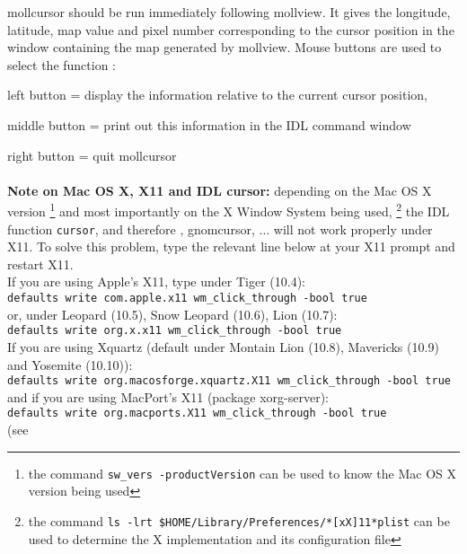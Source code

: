 \begin{codedescription}
{mollcursor should be run immediately following mollview. It gives the
longitude, latitude, map value and pixel number
corresponding to the cursor position in the window containing the map generated
by mollview. Mouse buttons are used to select the function :  

left button = display the information relative to the current cursor position, 

middle button = print out this information in the IDL command window 

right button = quit mollcursor\\
\\
{\bf{Note on Mac OS X, X11 and IDL cursor:}} 
depending on the Mac OS X version%
\footnote{the command {\tt sw\_vers -productVersion}
 can be used to know the Mac OS X version being used}
and most importantly on the X Window System being used,%
\footnote{the command
{\tt ls -lrt  \$HOME/Library/Preferences/*[xX]11*plist}
can be used to determine the X implementation and its configuration file}
the IDL function {\tt cursor}, and therefore \healpix \thedocid,
gnomcursor, $\ldots$ will not
work properly under X11. To solve this problem, type the relevant line below at your X11 prompt and restart X11.\\
If you are using Apple's X11, type under Tiger (10.4): \\
{\footnotesize {\tt defaults write com.apple.x11 wm\_click\_through -bool true}} \\
or, under Leopard (10.5), Snow Leopard (10.6), Lion (10.7): \\
{\footnotesize {\tt defaults write org.x.x11 wm\_click\_through -bool true}} \\
If you are using Xquartz (default under Montain Lion (10.8), Mavericks (10.9)
and Yosemite (10.10)): \\
{\footnotesize {\tt defaults write org.macosforge.xquartz.X11 wm\_click\_through -bool true}}\\
and if you are using MacPort's X11 (package xorg-server):\\
{\footnotesize {\tt defaults write org.macports.X11 wm\_click\_through -bool true}}\\
(see
}
\end{codedescription}
